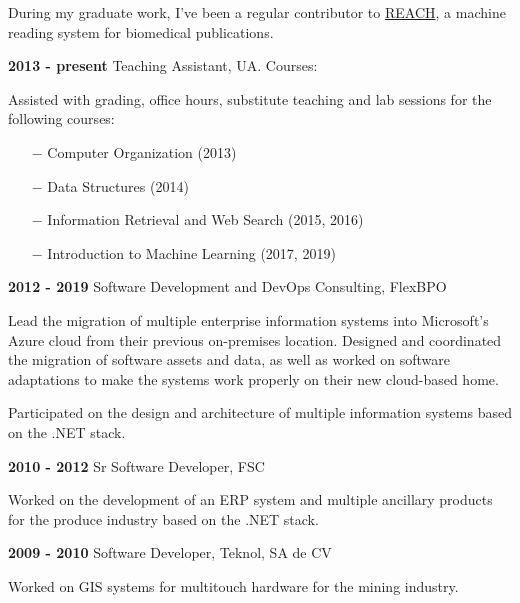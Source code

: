 \documentclass[letterpaper]{article}
\renewenvironment{itemize}{
  \begin{list}{}{
    \setlength{\leftmargin}{1.5em}
  }
}{
  \end{list}
}
\begin{document}
\begin{itemize}
\begin{itemize}
 During my graduate work, I've been a regular contributor to \href{https://github.com/clulab/reach/}{REACH}, a machine reading system for biomedical publications.
	\end{itemize}
\item \textbf{2013 - present} Teaching Assistant, UA. Courses:
\item \begin{itemize}
	\item Assisted with grading, office hours, substitute teaching and lab sessions for the following courses:
	\item \begin{enumerate}
	\item[$-$] Computer Organization (2013)
	\item[$-$] Data Structures (2014)
	\item[$-$] Information Retrieval and Web Search (2015, 2016)
	\item[$-$] Introduction to Machine Learning (2017, 2019)
	\end{enumerate}
\end{itemize}
\item \textbf{2012 - 2019} Software Development and DevOps Consulting, FlexBPO
\item \begin{itemize}
	\item Lead the migration of multiple enterprise information systems into Microsoft's Azure cloud from their previous on-premises location. Designed and coordinated the migration of software assets and data, as well as worked on software adaptations to make the systems work properly on their new cloud-based home.
	\item Participated on the design and architecture of multiple information systems based on the .NET stack.
\end{itemize}
\item \textbf{2010 - 2012} Sr Software Developer, FSC
\item \begin{itemize}
\item Worked on the development of an ERP system and multiple ancillary products for the produce industry based on the .NET stack.
\end{itemize}
\item \textbf{2009 - 2010} Software Developer, Teknol, SA de CV
\item \begin{itemize}
\item Worked on GIS systems for multitouch hardware for the mining industry.

\end{itemize}
\end{itemize}
\end{document}
